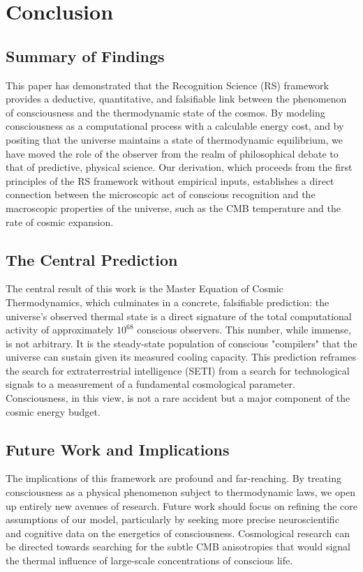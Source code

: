 \documentclass[11pt,a4paper]{article}
\theoremstyle{definition}
\theoremstyle{remark}
\begin{document}
\section{Conclusion}

\subsection{Summary of Findings}
This paper has demonstrated that the Recognition Science (RS) framework provides a deductive, quantitative, and falsifiable link between the phenomenon of consciousness and the thermodynamic state of the cosmos. By modeling consciousness as a computational process with a calculable energy cost, and by positing that the universe maintains a state of thermodynamic equilibrium, we have moved the role of the observer from the realm of philosophical debate to that of predictive, physical science. Our derivation, which proceeds from the first principles of the RS framework without empirical inputs, establishes a direct connection between the microscopic act of conscious recognition and the macroscopic properties of the universe, such as the CMB temperature and the rate of cosmic expansion.

\subsection{The Central Prediction}
The central result of this work is the Master Equation of Cosmic Thermodynamics, which culminates in a concrete, falsifiable prediction: the universe's observed thermal state is a direct signature of the total computational activity of approximately \(10^{68}\) conscious observers. This number, while immense, is not arbitrary. It is the steady-state population of conscious "compilers" that the universe can sustain given its measured cooling capacity. This prediction reframes the search for extraterrestrial intelligence (SETI) from a search for technological signals to a measurement of a fundamental cosmological parameter. Consciousness, in this view, is not a rare accident but a major component of the cosmic energy budget.

\subsection{Future Work and Implications}
The implications of this framework are profound and far-reaching. By treating consciousness as a physical phenomenon subject to thermodynamic laws, we open up entirely new avenues of research. Future work should focus on refining the core assumptions of our model, particularly by seeking more precise neuroscientific and cognitive data on the energetics of consciousness. Cosmological research can be directed towards searching for the subtle CMB anisotropies that would signal the thermal influence of large-scale concentrations of conscious life.
\end{document}

